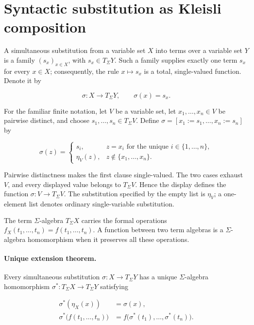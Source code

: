 \documentclass[11pt]{article}
\begin{document}
\section{Syntactic substitution as Kleisli
composition}\label{syntactic-substitution-as-kleisli-composition}

A simultaneous substitution from a variable set \(X\) into terms over a
variable set \(Y\) is a family \((s_x)_{x\in X}\), with
\(s_x\in T_\Sigma Y\). Such a family supplies exactly one term \(s_x\) for
every \(x\in X\); consequently, the rule \(x\mapsto s_x\) is a total,
single-valued function. Denote it by

\[
\sigma:X\longrightarrow T_\Sigma Y,
\qquad \sigma(x)=s_x.
\]

For the familiar finite notation, let \(V\) be a variable set, let
\(x_1,\ldots,x_n\in V\) be pairwise distinct, and choose
\(s_1,\ldots,s_n\in T_\Sigma V\). Define
\(\sigma=[x_1:=s_1,\ldots,x_n:=s_n]\) by

\[
\sigma(z)=
\begin{cases}
s_i,&z=x_i\text{ for the unique }i\in\{1,\ldots,n\},\\
\eta_V(z),&z\notin\{x_1,\ldots,x_n\}.
\end{cases}
\]

Pairwise distinctness makes the first clause single-valued. The two cases
exhaust \(V\), and every displayed value belongs to \(T_\Sigma V\). Hence the
display defines the function \(\sigma:V\to T_\Sigma V\). The substitution specified by the empty list is
\(\eta_V\); a one-element list denotes ordinary single-variable substitution.

The term \(\Sigma\)-algebra \(T_\Sigma X\) carries the formal operations
\(f_X(t_1,\ldots,t_n)=f(t_1,\ldots,t_n)\). A function between two term
algebras is a \(\Sigma\)-algebra homomorphism when it preserves all these
operations.

\paragraph{Unique extension theorem.}
Every simultaneous substitution \(\sigma:X\to T_\Sigma Y\) has a unique
\(\Sigma\)-algebra homomorphism
\(\sigma^*:T_\Sigma X\to T_\Sigma Y\) satisfying

\[
\begin{aligned}
\sigma^*(\eta_X(x))&=\sigma(x),\\
\sigma^*\bigl(f(t_1,\ldots,t_n)\bigr)
&=f\bigl(\sigma^*(t_1),\ldots,\sigma^*(t_n)\bigr).
\end{aligned}
\]
\end{document}

